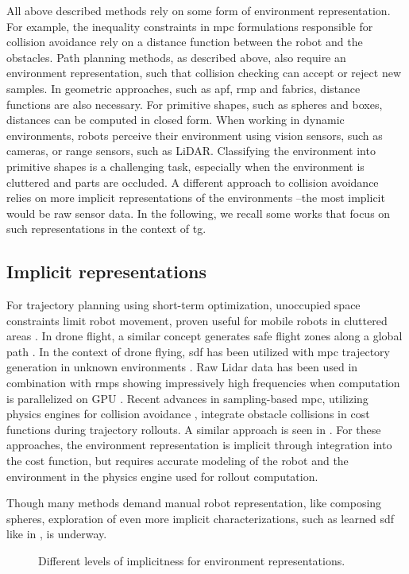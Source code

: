 All above described methods rely on some form of environment
representation. For example, the inequality constraints in
\ac{mpc} formulations responsible for collision avoidance
rely on a distance function between the robot and the
obstacles. Path planning methods, as described above, 
also require an environment representation, such that
collision checking can accept or reject new samples. In
geometric approaches, such as \ac{apf}, \ac{rmp} and
\ac{fabrics}, distance functions are also necessary.
For primitive shapes, such as spheres and boxes, distances
can be computed in closed form. When working in dynamic
environments, robots perceive their environment using vision
sensors, such as cameras, or range sensors, such as LiDAR.
Classifying the environment into primitive shapes is a
challenging task, especially when the environment is
cluttered and parts are occluded. A different approach to
collision avoidance relies on more implicit representations
of the environments --the most implicit would be raw sensor
data. In the following, we recall some works that focus on
such representations in the context of \ac{tg}.

\subsection{Implicit representations}
\label{sub:implicit_representations}

For trajectory planning using short-term optimization,
unoccupied space constraints limit robot movement, proven
useful for mobile robots in cluttered areas
\cite{Brito2019}. In drone flight, a similar concept
generates safe flight zones along a global path
\cite{Liu2017a,Tordesillas2019a,tordesillas2021mader}. In
the context of drone flying, \ac{sdf} has been utilized with
\ac{mpc} trajectory generation in unknown environments
\cite{Oleynikova2017voxblox}. Raw Lidar data has been used
in combination with \acp{rmp} showing impressively high
frequencies when computation is parallelized on GPU
\cite{Pantic2023obstacle}. Recent advances in sampling-based
\ac{mpc}, utilizing physics engines for collision avoidance
\cite{Pezzato2023sampling}, integrate obstacle collisions in
cost functions during trajectory rollouts. A similar
approach is seen in \cite{Sundaralingam2023curobo}. For
these approaches, the environment representation is implicit
through integration into the cost function, but requires
accurate modeling of the robot and the environment in the
physics engine used for rollout computation.

Though many methods demand manual robot representation, like
composing spheres, exploration of even more implicit
characterizations, such as learned \ac{sdf} like in
\cite{Liu2022regularized,Koptev2023neural}, is underway.

\begin{figure}
  \centering
  
  \caption{Different levels of implicitness for environment representations.}
  \label{fig:ral24_overview}
\end{figure}


